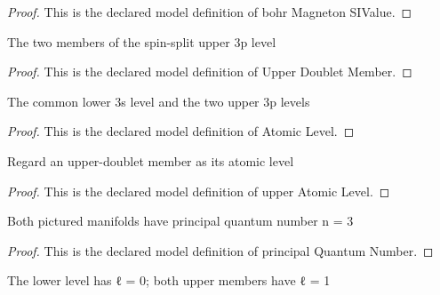 \begin{proof}
  This is the declared model definition of bohr Magneton SIValue.
\end{proof}
\begin{definition}
  \label{def:physics:phyx-mini-0578:phyxminiproblems-problemphyxmini0578-upperdoubletmember}
  The two members of the spin-split upper 3p level
\end{definition}
\begin{proof}
  This is the declared model definition of Upper Doublet Member.
\end{proof}
\begin{definition}
  \label{def:physics:phyx-mini-0578:phyxminiproblems-problemphyxmini0578-atomiclevel}
  The common lower 3s level and the two upper 3p levels
\end{definition}
\begin{proof}
  This is the declared model definition of Atomic Level.
\end{proof}
\begin{definition}
  \label{def:physics:phyx-mini-0578:phyxminiproblems-problemphyxmini0578-upperatomiclevel}
  Regard an upper-doublet member as its atomic level
\end{definition}
\begin{proof}
  This is the declared model definition of upper Atomic Level.
\end{proof}
\begin{definition}
  \label{def:physics:phyx-mini-0578:phyxminiproblems-problemphyxmini0578-principalquantumnumber}
  Both pictured manifolds have principal quantum number n = 3
\end{definition}
\begin{proof}
  This is the declared model definition of principal Quantum Number.
\end{proof}
\begin{definition}
  \label{def:physics:phyx-mini-0578:phyxminiproblems-problemphyxmini0578-orbitalangularmomentumquantumnumber}
  The lower level has ℓ = 0; both upper members have ℓ = 1
\end{definition}
